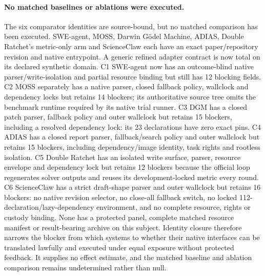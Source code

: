 \paragraph{No matched baselines or ablations were executed.}
The six comparator identities are source-bound, but no matched comparison has
been executed. SWE-agent, MOSS, Darwin G\"odel Machine, ADIAS, Double Ratchet's
metric-only arm and ScienceClaw each have an exact paper/repository revision
and native entrypoint. A generic refined adapter contract is now total on its
declared synthetic domain. C1 SWE-agent now has an outcome-blind native
parser/write-isolation and partial resource binding but still has 12 blocking
fields. C2 MOSS separately has a native parser, closed fallback policy,
wallclock and dependency locks but retains 14 blockers; its authoritative
source tree omits the benchmark runtime required by its native trial runner.
C3 DGM has a closed patch parser, fallback policy and outer wallclock but
retains 15 blockers, including a resolved dependency lock: its 23 declarations
have zero exact pins. C4 ADIAS has a closed report parser, fallback/search
policy and outer wallclock but retains 15 blockers, including dependency/image
identity, task rights and rootless isolation. C5 Double Ratchet has an isolated
write surface, parser, resource envelope and dependency lock but retains 12
blockers because the official loop regenerates solver outputs and reuses its
development-locked metric every round. C6 ScienceClaw has a strict draft-shape
parser and outer wallclock but retains 16 blockers: no native revision selector,
no close-all fallback switch, no locked 112-declaration/lazy-dependency
environment, and no complete resource, rights or custody binding. None has a
protected panel, complete matched resource manifest or result-bearing archive
on this subject.
Identity closure therefore narrows the blocker from which systems to whether
their native interfaces can be translated lawfully and executed under equal
exposure without protected feedback. It supplies no effect estimate, and the
matched baseline and ablation comparison remains undetermined rather than
null.

